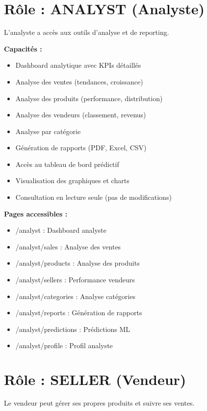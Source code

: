 \documentclass[12pt,a4paper]{report}
\begin{document}
\section{Rôle : ANALYST (Analyste)}

L'analyste a accès aux outils d'analyse et de reporting.

\textbf{Capacités :}
\begin{itemize}[noitemsep]
    \item Dashboard analytique avec KPIs détaillés
    \item Analyse des ventes (tendances, croissance)
    \item Analyse des produits (performance, distribution)
    \item Analyse des vendeurs (classement, revenus)
    \item Analyse par catégorie
    \item Génération de rapports (PDF, Excel, CSV)
    \item Accès au tableau de bord prédictif
    \item Visualisation des graphiques et charts
    \item Consultation en lecture seule (pas de modifications)
\end{itemize}

\textbf{Pages accessibles :}
\begin{itemize}[noitemsep]
    \item /analyst : Dashboard analyste
    \item /analyst/sales : Analyse des ventes
    \item /analyst/products : Analyse des produits
    \item /analyst/sellers : Performance vendeurs
    \item /analyst/categories : Analyse catégories
    \item /analyst/reports : Génération de rapports
    \item /analyst/predictions : Prédictions ML
    \item /analyst/profile : Profil analyste
\end{itemize}

\section{Rôle : SELLER (Vendeur)}

Le vendeur peut gérer ses propres produits et suivre ses ventes.
\end{document}
